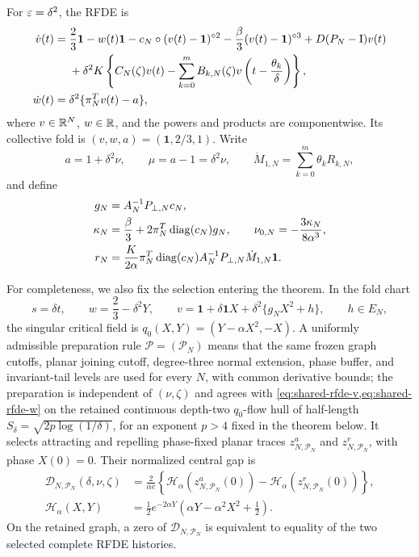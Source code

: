 For \(\varepsilon=\delta^2\), the RFDE is
\begin{align}
 \dot v(t)={}&\frac23\mathbf1-w(t)\mathbf1
 -c_N\circ(v(t)-\mathbf1)^{\circ2}
 -\frac\beta3(v(t)-\mathbf1)^{\circ3}+D(P_N-\mathrm I)v(t)\notag\\
 &+\delta^2K\left\{C_N(\zeta)v(t)
 -\sum_{k=0}^mB_{k,N}(\zeta)
       v\left(t-\frac{\theta_k}{\delta}\right)\right\},
                                                               \label{eq:shared-rfde-v}\\
 \dot w(t)={}&\delta^2\{\pi_N^Tv(t)-a\},             \label{eq:shared-rfde-w}
\end{align}
where \(v\in\mathbb R^N\), \(w\in\mathbb R\), and the powers and products are
componentwise.  Its collective fold is
\((v,w,a)=(\mathbf1,2/3,1)\).  Write
\begin{equation}
 a=1+\delta^2\nu,\qquad \mu=a-1=\delta^2\nu,\qquad
 \dot M_{1,N}=\sum_{k=0}^m\theta_kR_{k,N},             \label{eq:shared-parameters}
\end{equation}
and define
\begin{align}
 g_N&=A_N^{-1}P_{\perp,N}c_N,\notag\\
 \kappa_N&=\frac\beta3+2\pi_N^T\operatorname{diag}(c_N)g_N,\qquad
 \nu_{0,N}=-\frac{3\kappa_N}{8\alpha^3},             \label{eq:shared-center}\\
 r_N&=\frac{K}{2\alpha}\pi_N^T\operatorname{diag}(c_N)
 A_N^{-1}P_{\perp,N}\dot M_{1,N}\mathbf1.            \label{eq:shared-rn}
\end{align}

For completeness, we also fix the selection entering the theorem.  In the
fold chart
\[
 s=\delta t,\qquad w=\frac23-\delta^2Y,\qquad
 v=\mathbf1+\delta\mathbf1X
       +\delta^2\{g_NX^2+h\},\qquad h\in E_N,
\]
the singular critical field is
\(q_0(X,Y)=(Y-\alpha X^2,-X)\).  A uniformly admissible preparation rule
\(\mathcal P=(\mathcal P_N)\) means that the same frozen graph cutoffs,
planar joining cutoff, degree-three normal extension, phase buffer, and
invariant-tail levels are used for every \(N\), with common derivative
bounds; the preparation is independent of \((\nu,\zeta)\) and agrees with
\cref{eq:shared-rfde-v,eq:shared-rfde-w} on the retained continuous
depth-two \(q_0\)-flow hull of half-length
\(S_\delta=\sqrt{2p\log(1/\delta)}\), for an exponent \(p>4\) fixed in the
theorem below.  It selects attracting and repelling phase-fixed planar
traces \(z^a_{N,\mathcal P_N}\) and
\(z^r_{N,\mathcal P_N}\), with phase \(X(0)=0\).  Their normalized central
gap is
\begin{align}
 \mathscr D_{N,\mathcal P_N}(\delta,\nu,\zeta)
  &=\frac{2}{\alpha e}\left\{
    \mathscr H_\alpha(z^a_{N,\mathcal P_N}(0))
   -\mathscr H_\alpha(z^r_{N,\mathcal P_N}(0))\right\},
                                                               \label{eq:shared-gap}\\
 \mathscr H_\alpha(X,Y)
  &=\frac12e^{-2\alpha Y}
    \left(\alpha Y-\alpha^2X^2+\frac12\right).       \label{eq:shared-first-integral}
\end{align}
On the retained graph, a zero of \(\mathscr D_{N,\mathcal P_N}\) is
equivalent to equality of the two selected complete RFDE histories.

